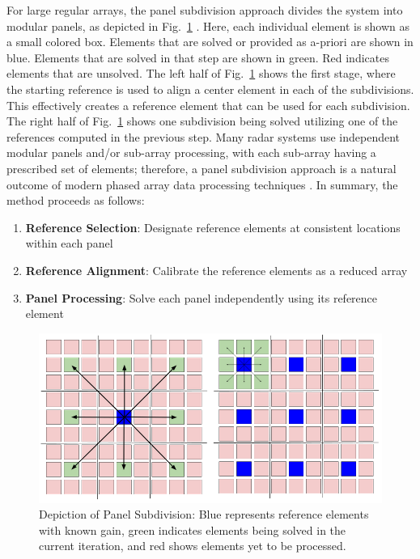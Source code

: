 \documentclass[journal]{IEEEtran}
\begin{document}
For large regular arrays, the panel subdivision approach divides the system into modular panels, as depicted in Fig.~\ref{fig:panelSubdivision} \cite{sasser}.
Here, each individual element is shown as a small colored box. Elements that are solved or provided as a-priori are shown in blue. Elements that are solved in that step are shown in green. Red indicates elements that are unsolved. 
%
The left half of Fig.~\ref{fig:panelSubdivision} shows the first stage, where the starting reference is used to align a center element in each of the subdivisions. This effectively creates a reference element that can be used for each subdivision.
%
The right half of Fig.~\ref{fig:panelSubdivision} shows one subdivision being solved utilizing one of the references computed in the previous step.
Many radar systems use independent modular panels and/or sub-array processing, with each sub-array having a prescribed set of elements; therefore, a panel subdivision approach is a natural outcome of modern phased array data processing techniques \cite{horuscal,horusgeneral,benefits,linder2025sub,ganti2018calibration,brown2014phased,pesavento2002direction, nickel,conway2018, harger2021, conway2013, herd2015}. In summary, the method proceeds as follows:
\begin{enumerate}
    \item \textbf{Reference Selection}: Designate reference elements at consistent locations within each panel
    \item \textbf{Reference Alignment}: Calibrate the reference elements as a reduced array
    \item \textbf{Panel Processing}: Solve each panel independently using its reference element
\end{enumerate}




\begin{figure}[hptb]
    \centering
    \includegraphics[width=0.95\linewidth]{panelSubdivision.png}
    \caption{Depiction of Panel Subdivision: Blue represents reference elements with known gain, green indicates elements being solved in the current iteration, and red shows elements yet to be processed. }
    \label{fig:panelSubdivision}
\end{figure}
\end{document}
